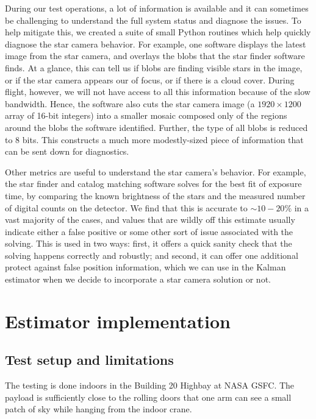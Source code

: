 During our test operations, a lot of information is available and  it can sometimes be challenging to understand the full system status and diagnose the issues. To help mitigate this, we created a suite of small Python routines which help quickly diagnose the star camera behavior. For example, one software displays the latest image from the star camera, and overlays the blobs that the star finder software finds. At a glance, this can tell us if blobs are finding visible stars in the image, or if the star camera appears our of focus, or if there is a cloud cover. During flight, however, we will not have access to all this information because of the slow bandwidth. Hence, the software also cuts the star camera image (a $1920\times 1200$ array of 16-bit integers) into a smaller mosaic composed only of the regions around the blobs the software identified. Further, the type of all blobs is reduced to 8 bits. This constructs a much more modestly-sized piece of information that can be sent down for diagnostics.

Other metrics are useful to understand the star camera's behavior. For example, the star finder and catalog matching software solves for the best fit of exposure time, by comparing the known brightness of the stars and the measured number of digital counts on the detector. We find that this is accurate to $\sim 10-20\%$ in a vast majority of the cases, and values that are wildly off this estimate usually indicate either a false positive or some other sort of issue associated with the solving. This is used in two ways: first, it offers a quick sanity check that the solving happens correctly and robustly; and second, it can offer one additional protect against false position information, which we can use in the Kalman estimator when we decide to incorporate a star camera solution or not.


\section{Estimator implementation}

\subsection{Test setup and limitations}

The testing is done indoors in the Building 20 Highbay at NASA GSFC. The payload is sufficiently close to the rolling doors that one arm can see a small patch of sky while hanging from the indoor crane.

